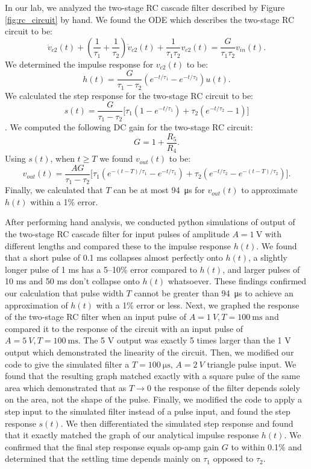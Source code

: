 \documentclass[12pt]{article}
\begin{document}
In our lab, we analyzed the two-stage RC cascade filter described by Figure \ref{fig:rc_circuit} by hand. We found the ODE which describes the two-stage RC circuit to be: \[\ddot v_{c2}(t) + \left(\frac{1}{\tau_1} + \frac{1}{\tau_2}\right)\dot v_{c2}(t) + \frac{1}{\tau_1\tau_2}v_{c2}(t) = \frac{G}{\tau_1\tau_2}v_{in}(t).\] We determined the impulse response for \(v_{c2}(t)\) to be: \[h(t) = \frac{G}{\tau_1 - \tau_2}\left(e^{-t/\tau_1} - e^{-t/\tau_2}\right)u(t).\] We calculated the step response for the two-stage RC circuit to be: \[s(t) = \frac{G}{\tau_1 - \tau_2}\Big[\tau_1\left(1 - e^{-t/\tau_1}\right) + \tau_2\left(e^{-t/\tau_2} - 1\right)\Big]\].  We computed the following DC gain for the two-stage RC circuit: \[G = 1 + \frac{R_5}{R_4}.\] Using \(s(t)\), when $t\geq T$ we found \(v_{out}(t)\) to be: \[v_{out}(t) = \frac{AG}{\tau_1 - \tau_2}\Big[\tau_1\left(e^{-(t-T)/\tau_1} - e^{-t/\tau_1}\right) + \tau_2\left(e^{-t/\tau_2} - e^{-(t-T)/\tau_2}\right)\Big].\] Finally, we calculated that \(T\) can be at most \qty{94}{\micro\second} for \(v_{out}(t)\) to approximate \(h(t)\) within a 1\% error.

After performing hand analysis, we conducted python simulations of output of the two-stage RC cascade filter for input pulses of amplitude \(A = \qty{1}{\volt}\) with different lengths and compared these to the impulse response \(h(t)\). We found that a short pulse of 0.1 ms collapses almost perfectly onto \(h(t)\), a slightly longer pulse of 1 ms has a 5--10\% error compared to \(h(t)\), and larger pulses of 10 ms and 50 ms don't collapse onto \(h(t)\) whatsoever. These findings confirmed our calculation that pulse width \(T\) cannot be greater than \qty{94}{\micro\second} to achieve an approximation of \(h(t)\) with a 1\% error or less. Next, we graphed the response of the two-stage RC filter when an input pulse of \(A = \qty{1}{V}, T = \qty{100}{\milli\second}\) and compared it to the response of the circuit with an input pulse of \(A = \qty{5}{V}, T = \qty{100}{\milli\second}\). The 5 V output was exactly 5 times larger than the 1 V output which demonstrated the linearity of the circuit. Then, we modified our code to give the simulated filter a \(T = \qty{100}{\micro\second},\, A = \qty{2}{V}\) triangle pulse input. We found that the resulting graph matched exactly with a square pulse of the same area which demonstrated that as \(T \rightarrow 0\) the response of the filter depends solely on the area, not the shape of the pulse. Finally, we modified the code to apply a step input to the simulated filter instead of a pulse input, and found the step response \(s(t)\). We then differentiated the simulated step response and found that it exactly matched the graph of our analytical impulse response \(h(t)\). We confirmed that the final step response equals op-amp gain \(G\) to within 0.1\% and determined that the settling time depends mainly on \(\tau_{1}\) opposed to \(\tau_{2}\).
\end{document}
